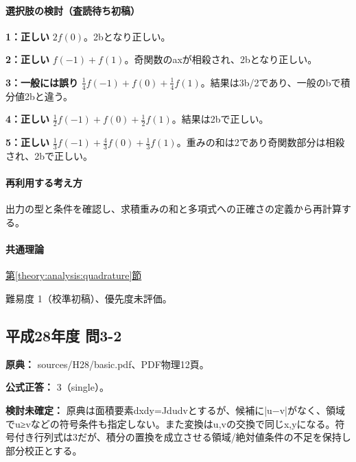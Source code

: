 \paragraph{選択肢の検討（査読待ち初稿）}\mbox{}\par

\noindent\textbf{1：正しい} \(2f(0)\)。2bとなり正しい。\par

\noindent\textbf{2：正しい} \(f(-1)+f(1)\)。奇関数のaxが相殺され、2bとなり正しい。\par

\noindent\textbf{3：一般には誤り} \(\frac14f(-1)+f(0)+\frac14f(1)\)。結果は3b/2であり、一般のbで積分値2bと違う。\par

\noindent\textbf{4：正しい} \(\frac12f(-1)+f(0)+\frac12f(1)\)。結果は2bで正しい。\par

\noindent\textbf{5：正しい} \(\frac13f(-1)+\frac43f(0)+\frac13f(1)\)。重みの和は2であり奇関数部分は相殺され、2bで正しい。\par

\paragraph{再利用する考え方} 出力の型と条件を確認し、求積重みの和と多項式への正確さの定義から再計算する。

\paragraph{共通理論} \hyperref[theory:analysis:quadrature]{第\ref*{theory:analysis:quadrature}節}

\par 難易度 1（校準初稿）、優先度未評価。

\subsection{平成28年度 問3-2}
\label{q:h28-reg-basic-3-2}

\noindent\textbf{原典：} sources/H28/basic.pdf、PDF物理12頁。

\textbf{公式正答：} 3（single）。

\par\textbf{検討未確定：} 原典は面積要素dxdy=\allowbreak{}Jdudvとするが、候補に|u−v|がなく、領域でu≥vなどの符号条件も指定しない。また変換はu,vの交換で同じx,yになる。符号付き行列式は3だが、積分の置換を成立させる領域/絶対値条件の不足を保持し部分校正とする。

